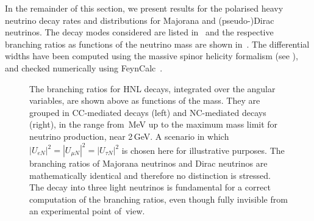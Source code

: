 In the remainder of this section, we present results for the polarised heavy neutrino decay rates %
and distributions for Majorana and (pseudo-)Dirac neutrinos.
The decay modes considered are listed in~ and the respective branching ratios as functions of %
the neutrino mass are shown in~.
%
The differential widths have been computed using the massive spinor helicity formalism %
(see \eg {}), and checked numerically using %
FeynCalc~\cite{Shtabovenko:2016sxi,Mertig:1990an}.

\begin{figure}
	\centering
	\resizebox{\textwidth}{!}{}
	\footnotesize
	\caption{The branching ratios for HNL decays, integrated over the angular variables, are shown above %
		as functions of the mass.
		They are grouped in CC-mediated decays (left) and NC-mediated decays (right), in the range from \,MeV up to %
		the maximum mass limit for neutrino production, near 2\,GeV. 
		A scenario in which $|U_{e N}|^2=|U_{\mu N}|^2=|U_{\tau N}|^2$ is chosen here %
		for illustrative purposes.
		The branching ratios of Majorana neutrinos and Dirac neutrinos are mathematically identical and %
		therefore no distinction is stressed.
		The decay into three light neutrinos is fundamental for a correct computation %
		of the branching ratios, even though fully invisible from an experimental point of~view.}
	\label{fig:branch}
\end{figure}

